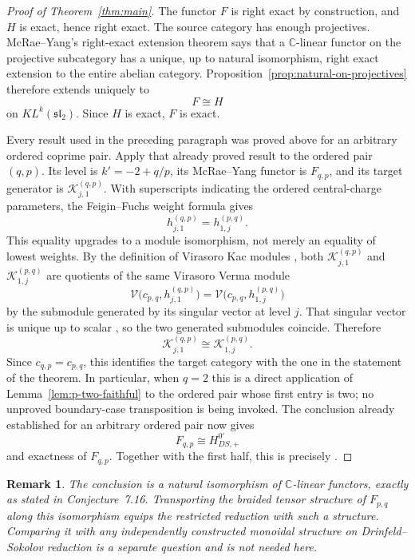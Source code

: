 \documentclass[12pt,leqno]{amsart}
\numberwithin{equation}{section}
\newtheorem{rmk}[thm]{Remark}
\newcommand{\KL}{KL}
\newcommand{\Kac}{\mathcal K}
\def\C{\mathbb{C}}
\begin{document}
\begin{proof}[Proof of Theorem~\ref{thm:main}]
The functor $F$ is right exact by construction, and $H$ is exact, hence
right exact.  The source category has enough projectives.  McRae--Yang's
right-exact extension theorem \cite[Theorem~6.7]{McRaeYang} says that a
$\C$-linear functor on the projective subcategory has a unique, up to natural
isomorphism, right exact extension to the entire abelian category.
Proposition~\ref{prop:natural-on-projectives} therefore extends uniquely to
\[
 F\cong H
\]
on $\KL^k(\mathfrak{sl}_2)$.  Since $H$ is exact, $F$ is exact.

Every result used in the preceding paragraph was proved above for an
arbitrary ordered coprime pair.  Apply that already proved result to the
ordered pair $(q,p)$.  Its level is $k'=-2+q/p$, its McRae--Yang functor is
$F_{q,p}$, and its target generator is
$\Kac_{j,1}^{(q,p)}$.  With superscripts indicating the ordered
central-charge parameters, the Feigin--Fuchs weight formula gives
\[
 h_{j,1}^{(q,p)}=h_{1,j}^{(p,q)}.
\]
This equality upgrades to a module isomorphism, not merely an equality of
lowest weights.  By the definition of Virasoro Kac modules
\cite[Remark~2.2]{McRaeSopin}, both $\Kac_{j,1}^{(q,p)}$ and
$\Kac_{1,j}^{(p,q)}$ are quotients of the same Virasoro Verma module
\[
 \mathcal V\bigl(c_{p,q},h_{j,1}^{(q,p)}\bigr)
 =\mathcal V\bigl(c_{p,q},h_{1,j}^{(p,q)}\bigr)
\]
by the submodule generated by its singular vector at level $j$.  That
singular vector is unique up to scalar
\cite[Proposition~2.2.1(3)]{CreutzigEtAl}, so the two generated submodules
coincide.  Therefore
\[
 \Kac_{j,1}^{(q,p)}\cong\Kac_{1,j}^{(p,q)}.
\]
Since $c_{q,p}=c_{p,q}$, this identifies the target category with the one in
the statement of the theorem.  In particular, when $q=2$ this is a direct
application of Lemma~\ref{lem:p-two-faithful} to the ordered pair whose first
entry is two; no unproved boundary-case transposition is being invoked.
The conclusion already established for an arbitrary ordered pair now gives
\[
 F_{q,p}\cong H^{0\prime}_{DS,+}
 \]
and exactness of $F_{q,p}$.  Together with the first half, this is precisely
\cite[Conjecture~7.16]{McRaeYang}.
\end{proof}

\begin{rmk}
The conclusion is a natural isomorphism of $\C$-linear functors, exactly as
stated in Conjecture~7.16.  Transporting the braided tensor structure of
$F_{p,q}$ along this isomorphism equips the restricted reduction with such a
structure.  Comparing it with any independently constructed monoidal
structure on Drinfeld--Sokolov reduction is a separate question and is not
needed here.
\end{rmk}
\end{document}
